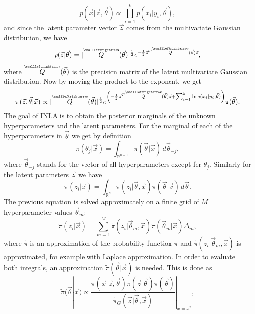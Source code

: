 \begin{equation}
    p(\vec{x}|\vec{z}, \vec{\theta}) \propto \prod_{i=1}^{k}p(x_i|y_i, \vec{\theta}),
\end{equation}
and since the latent parameter vector $\vec{z}$ comes from the multivariate Gaussian distribution, we have
\begin{equation}
    p(\vec{z}|\vec{\theta}) = |\tensor{Q}(\vec{\theta})|^{\frac{1}{2}} e^{-\frac{1}{2} \vec{z}^T \tensor{Q}(\vec{\theta}) \vec{z} },
\end{equation}
where $\tensor{Q}(\vec{\theta})$ is the precision matrix of the latent multivariate Gaussian distribution. Now by moving the product to the exponent, we get
\begin{equation}
    \pi(\vec{z}, \vec{\theta}|\vec{x}) \propto |\tensor{Q}(\vec{\theta})|^{\frac{1}{2}} e^{\left(-\frac{1}{2} \vec{z}^T \tensor{Q}(\vec{\theta}) \vec{z} + \sum_{i=1}^{k}\ln{p(x_i|y_i, \vec{\theta})} \right)} \pi(\vec{\theta}).
\end{equation}
The goal of INLA is to obtain the posterior marginals of the unknown hyperparameters and the latent parameters. For the marginal of each of the hyperparameters in $\vec{\theta}$ we get by definition
\begin{equation}
    \pi(\theta_j|\vec{x}) = \int_{\mathbb{R}^{n-1}}\pi(\vec{\theta}|\vec{x}) \, d\vec{\theta}_{-j}, 
\end{equation}
where $\vec{\theta}_{-j}$ stands for the vector of all hyperparameters except for $\theta_j$. Similarly for the latent parameters $\vec{z}$ we have
\begin{equation}
    \pi(z_i|\vec{x}) = \int_{\mathbb{R}^{n}} \pi(z_i|\vec{\theta},\vec{x}) \pi(\vec{\theta}|\vec{x}) \, d\vec{\theta}.
\end{equation}
The previous equation is solved approximately on a finite grid of $M$ hyperparameter values $\vec{\theta}_m$:
\begin{equation}
    \tilde{\pi}(z_i|\vec{x}) = \sum_{m=1}^M \tilde{\pi}(z_i|\vec{\theta}_m,\vec{x}) \tilde{\pi}(\vec{\theta}_m|\vec{x}) \Delta_m,
\end{equation}
where $\tilde{\pi}$ is an approximation of the probability function $\pi$ and $\tilde{\pi}(z_i|\vec{\theta}_m,\vec{x})$ is approximated, for example with Laplace approximation. In order to evaluate both integrals, an approximation $\tilde{\pi}(\vec{\theta}|\vec{x})$ is needed. This is done as 
\begin{equation}
    \tilde{\pi}(\vec{\theta}|\vec{x}) \propto \frac{ \pi(\vec{x}|\vec{z},\vec{\theta}) \pi(\vec{z}|\vec{\theta}) \pi(\vec{\theta})}{\tilde{\pi}_G(\vec{z}|\vec{\theta},\vec{x})}|_{x=x^*},
\end{equation}

